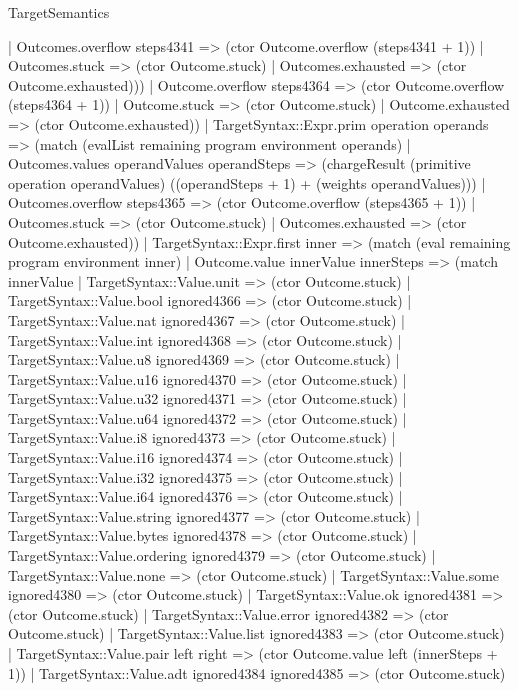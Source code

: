 \begin{lexlean}{TargetSemantics}
\begin{semanticmodule}
{            | Outcomes.overflow steps4341 => (ctor Outcome.overflow (steps4341 + 1))
            | Outcomes.stuck => (ctor Outcome.stuck)
            | Outcomes.exhausted => (ctor Outcome.exhausted)))
        | Outcome.overflow steps4364 => (ctor Outcome.overflow (steps4364 + 1))
        | Outcome.stuck => (ctor Outcome.stuck)
        | Outcome.exhausted => (ctor Outcome.exhausted))
      | TargetSyntax::Expr.prim operation operands => (match (evalList remaining program environment operands)
        | Outcomes.values operandValues operandSteps => (chargeResult (primitive operation operandValues) ((operandSteps + 1) + (weights operandValues)))
        | Outcomes.overflow steps4365 => (ctor Outcome.overflow (steps4365 + 1))
        | Outcomes.stuck => (ctor Outcome.stuck)
        | Outcomes.exhausted => (ctor Outcome.exhausted))
      | TargetSyntax::Expr.first inner => (match (eval remaining program environment inner)
        | Outcome.value innerValue innerSteps => (match innerValue
          | TargetSyntax::Value.unit => (ctor Outcome.stuck)
          | TargetSyntax::Value.bool ignored4366 => (ctor Outcome.stuck)
          | TargetSyntax::Value.nat ignored4367 => (ctor Outcome.stuck)
          | TargetSyntax::Value.int ignored4368 => (ctor Outcome.stuck)
          | TargetSyntax::Value.u8 ignored4369 => (ctor Outcome.stuck)
          | TargetSyntax::Value.u16 ignored4370 => (ctor Outcome.stuck)
          | TargetSyntax::Value.u32 ignored4371 => (ctor Outcome.stuck)
          | TargetSyntax::Value.u64 ignored4372 => (ctor Outcome.stuck)
          | TargetSyntax::Value.i8 ignored4373 => (ctor Outcome.stuck)
          | TargetSyntax::Value.i16 ignored4374 => (ctor Outcome.stuck)
          | TargetSyntax::Value.i32 ignored4375 => (ctor Outcome.stuck)
          | TargetSyntax::Value.i64 ignored4376 => (ctor Outcome.stuck)
          | TargetSyntax::Value.string ignored4377 => (ctor Outcome.stuck)
          | TargetSyntax::Value.bytes ignored4378 => (ctor Outcome.stuck)
          | TargetSyntax::Value.ordering ignored4379 => (ctor Outcome.stuck)
          | TargetSyntax::Value.none => (ctor Outcome.stuck)
          | TargetSyntax::Value.some ignored4380 => (ctor Outcome.stuck)
          | TargetSyntax::Value.ok ignored4381 => (ctor Outcome.stuck)
          | TargetSyntax::Value.error ignored4382 => (ctor Outcome.stuck)
          | TargetSyntax::Value.list ignored4383 => (ctor Outcome.stuck)
          | TargetSyntax::Value.pair left right => (ctor Outcome.value left (innerSteps + 1))
          | TargetSyntax::Value.adt ignored4384 ignored4385 => (ctor Outcome.stuck)
}
\end{semanticmodule}
\end{lexlean}
